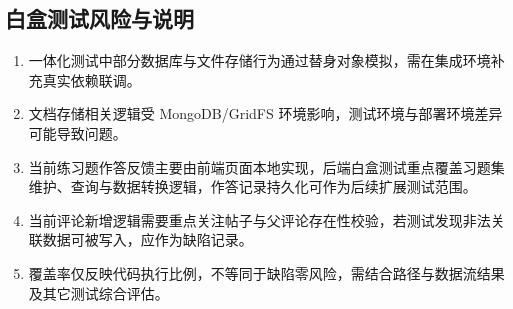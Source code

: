 \documentclass[12pt,a4paper]{ctexart}
\begin{document}
\subsection{白盒测试风险与说明}

\begin{enumerate}
  \item 一体化测试中部分数据库与文件存储行为通过替身对象模拟，需在集成环境补充真实依赖联调。
  \item 文档存储相关逻辑受 MongoDB/GridFS 环境影响，测试环境与部署环境差异可能导致问题。
  \item 当前练习题作答反馈主要由前端页面本地实现，后端白盒测试重点覆盖习题集维护、查询与数据转换逻辑，作答记录持久化可作为后续扩展测试范围。
  \item 当前评论新增逻辑需要重点关注帖子与父评论存在性校验，若测试发现非法关联数据可被写入，应作为缺陷记录。
  \item 覆盖率仅反映代码执行比例，不等同于缺陷零风险，需结合路径与数据流结果及其它测试综合评估。
\end{enumerate}
\end{document}
